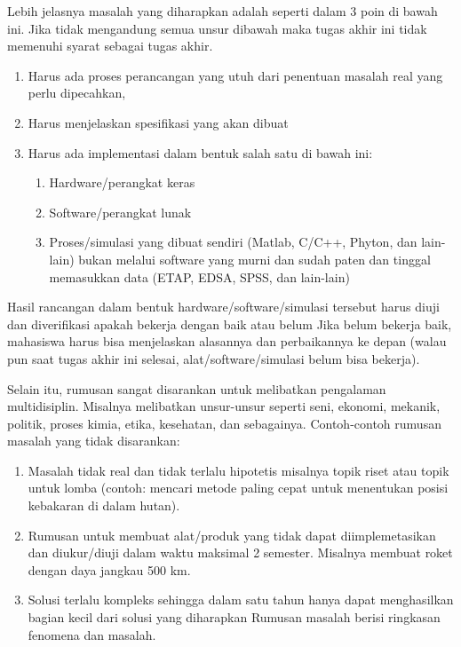 Lebih jelasnya masalah yang diharapkan adalah seperti dalam 3 poin di bawah ini. Jika tidak mengandung semua unsur dibawah maka tugas akhir ini tidak memenuhi syarat sebagai tugas akhir. \par
\begin{enumerate}
	\item Harus ada proses perancangan yang utuh dari penentuan masalah real yang perlu dipecahkan, 
	\item Harus menjelaskan spesifikasi yang akan dibuat
	\item Harus ada implementasi dalam bentuk salah satu di bawah ini:
	\begin{enumerate}
		\item Hardware/perangkat keras
		\item Software/perangkat lunak
		\item Proses/simulasi yang dibuat sendiri (Matlab, C/C++, Phyton, dan lain-lain) bukan melalui software yang murni dan sudah paten dan tinggal memasukkan data (ETAP, EDSA, SPSS, dan lain-lain)
	\end{enumerate}
\end{enumerate} \par

Hasil rancangan dalam bentuk hardware/software/simulasi tersebut harus diuji dan diverifikasi apakah bekerja dengan baik atau belum Jika belum bekerja baik, mahasiswa harus bisa menjelaskan alasannya dan perbaikannya ke depan (walau pun saat tugas akhir ini selesai, alat/software/simulasi belum bisa bekerja).\par

Selain itu, rumusan sangat disarankan untuk melibatkan pengalaman multidisiplin. Misalnya melibatkan unsur-unsur seperti seni, ekonomi, mekanik, politik, proses kimia, etika, kesehatan, dan sebagainya. Contoh-contoh rumusan masalah yang tidak disarankan: \par
\begin{enumerate}
	\item Masalah tidak real dan tidak terlalu hipotetis misalnya topik riset atau topik untuk lomba (contoh: mencari metode paling cepat untuk menentukan posisi kebakaran di dalam hutan).
	\item Rumusan untuk membuat alat/produk yang tidak dapat diimplemetasikan dan diukur/diuji dalam waktu maksimal 2 semester. Misalnya membuat roket dengan daya jangkau 500 km.
	\item Solusi terlalu kompleks sehingga dalam satu tahun hanya dapat menghasilkan bagian kecil dari solusi yang diharapkan Rumusan masalah berisi ringkasan fenomena dan masalah.
\end{enumerate} \par


